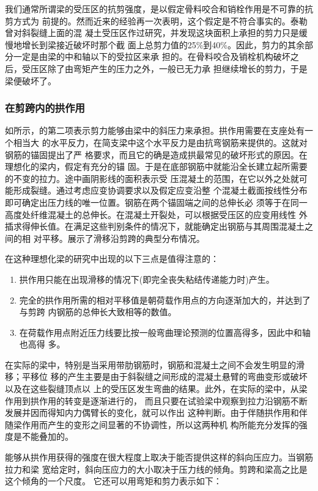 \documentclass[12pt,a4paper]{book}
\begin{document}
我们通常所谓梁的受压区的抗剪强度，是以假定骨料咬合和销栓作用是不可靠的抗剪方式为
前提的。然而近来的经验再一次表明，这个假定是不符合事实的。泰勒曾对斜裂缝上面的混
凝土受压区作过研究，并发现这块面积上承担的剪力只是缓慢地增长到梁接近破坏时那个截
面上总剪力值的25\%到40\%。因此，剪力的其余部分一定是由梁的中和轴以下的受拉区来承
担的。在骨料咬合及销栓机构破坏之后，受压区除了由弯矩产生的压力之外，一般已无力承
担继续增长的剪力，于是梁便破坏了。

\subsubsection{在剪跨内的拱作用}

如所示，的第二项表示剪力能够由梁中的斜压力来承担。拱作用需要在支座处有一个相当大
的水平反力，在简支梁中这个水平反力是由抗弯钢筋来提供的。这就对钢筋的锚固提出了严
格要求，而且它的确是造成拱最常见的破坏形式的原因。在理想化的梁内，假定有充分的锚
固。于是在底部钢筋中就能沿全长建立起所需要的不变的拉力。途中画阴影线的面积表示受
压混凝土的范围，在它以外之处就可能形成裂缝。通过考虑应变协调要求以及假定应变沿整
个混凝土截面按线性分布即可确定出压力线的唯一位置。钢筋在两个锚固端之间的总伸长必
须等于在同一高度处纤维混凝土的总伸长。在混凝土开裂处，可以根据受压区的应变用线性
外插求得伸长值。在满足这些判别条件的情况下，就能确定出钢筋与其周围混凝土之间的相
对平移。展示了滑移沿剪跨的典型分布情况。

在这种理想化梁的研究中出现的以下三点是值得注意的：
\begin{enumerate}
\item 拱作用只能在出现滑移的情况下(即完全丧失粘结传递能力时)产生。
\item 完全的拱作用所需的相对平移值是朝荷载作用点的方向逐渐加大的，并达到了与剪跨
  内钢筋的总伸长大致相等的数值。
\item 在荷载作用点附近压力线要比按一般弯曲理论预测的位置高得多，因此中和轴也高得
  多。
\end{enumerate}

在实际的梁中，特别是当采用带肋钢筋时，钢筋和混凝土之间不会发生明显的滑移；平移位
移的产生主要是由于斜裂缝之间形成的混凝土悬臂的弯曲变形或破坏以及在这些裂缝顶点以
上的受压区发生弯曲的结果。此外，在实际的梁中，从梁作用到拱作用的转变是逐渐进行的，
而且只要在试验梁中观察到拉力沿钢筋不断发展并因而得知内力偶臂长的变化，就可以作出
这种判断。由于伴随拱作用和伴随梁作用而产生的变形之间显著的不协调性，所以这两种机
构所能充分发挥的强度是不能叠加的。

能够从拱作用获得的强度在很大程度上取决于能否提供这样的斜向压应力。当钢筋拉力和梁
宽给定时，斜向压应力的大小取决于压力线的倾角。剪跨和梁高之比是这个倾角的一个尺度。
它还可以用弯矩和剪力表示如下：
\end{document}
